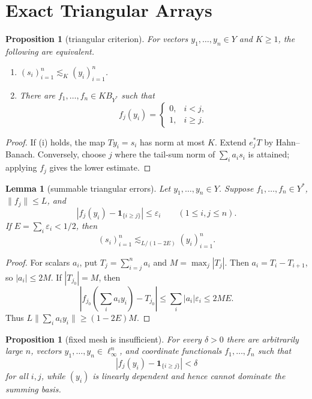 \documentclass[11pt]{article}
\newtheorem{proposition}[theorem]{Proposition}
\newtheorem{lemma}[theorem]{Lemma}
\theoremstyle{definition}
\theoremstyle{remark}
\begin{document}
\section{Exact Triangular Arrays}

\begin{proposition}[triangular criterion]\label{prop:triangular}
For vectors \(y_1,\ldots,y_n\in Y\) and \(K\geq1\), the following are
equivalent.
\begin{enumerate}[label=\textup{(\roman*)}]
\item \((s_i)_{i=1}^n\lesssim_K(y_i)_{i=1}^n\).
\item There are \(f_1,\ldots,f_n\in K B_{Y^*}\) such that
\[
 f_j(y_i)=
 \begin{cases}
 0,&i<j,\\
 1,&i\geq j.
 \end{cases}
\]
\end{enumerate}
\end{proposition}

\begin{proof}
If (i) holds, the map \(Ty_i=s_i\) has norm at most \(K\).  Extend
\(e_j^*T\) by Hahn--Banach.  Conversely, choose \(j\) where the tail-sum
norm of \(\sum_i a_i s_i\) is attained; applying \(f_j\) gives the lower
estimate.
\end{proof}

\begin{lemma}[summable triangular errors]\label{lem:summable-errors}
Let \(y_1,\ldots,y_n\in Y\).  Suppose \(f_1,\ldots,f_n\in Y^*\),
\(\|f_j\|\leq L\), and
\[
  |f_j(y_i)-\mathbf 1_{\{i\geq j\}}|\leq\varepsilon_i
  \qquad(1\leq i,j\leq n).
\]
If \(E=\sum_i\varepsilon_i<1/2\), then
\[
   (s_i)_{i=1}^n\lesssim_{L/(1-2E)}(y_i)_{i=1}^n.
\]
\end{lemma}

\begin{proof}
For scalars \(a_i\), put \(T_j=\sum_{i=j}^n a_i\) and
\(M=\max_j|T_j|\).  Then \(a_i=T_i-T_{i+1}\), so \(|a_i|\leq2M\).  If
\(|T_{j_0}|=M\), then
\[
 \left|f_{j_0}\left(\sum_i a_i y_i\right)-T_{j_0}\right|
 \leq \sum_i |a_i|\varepsilon_i
 \leq 2ME.
\]
Thus \(L\|\sum_i a_i y_i\|\geq(1-2E)M\).
\end{proof}

\begin{proposition}[fixed mesh is insufficient]\label{prop:fixed-mesh-bad}
For every \(\delta>0\) there are arbitrarily large \(n\), vectors
\(y_1,\ldots,y_n\in\ell_\infty^n\), and coordinate functionals
\(f_1,\ldots,f_n\) such that
\[
  |f_j(y_i)-\mathbf 1_{\{i\geq j\}}|<\delta
\]
for all \(i,j\), while \((y_i)\) is linearly dependent and hence cannot
dominate the summing basis.
\end{proposition}
\end{document}
